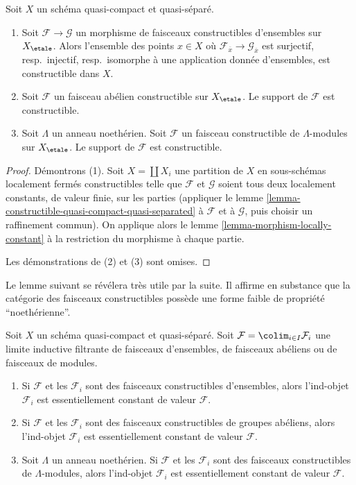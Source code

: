 \begin{lemma}
\label{lemma-support-constructible}
Soit $X$ un schéma quasi-compact et quasi-séparé.
\begin{enumerate}
\item Soit $\mathcal{F} \to \mathcal{G}$ un morphisme de faisceaux constructibles
d'ensembles sur $X_\etale$. Alors l'ensemble des points $x \in X$
où $\mathcal{F}_{\overline{x}} \to \mathcal{G}_{\overline{x}}$
est surjectif, resp.\ injectif, resp.\ isomorphe à une application donnée
d'ensembles, est constructible dans $X$.
\item Soit $\mathcal{F}$ un faisceau abélien constructible sur $X_\etale$.
Le support de $\mathcal{F}$ est constructible.
\item Soit $\Lambda$ un anneau noethérien.
Soit $\mathcal{F}$ un faisceau constructible de $\Lambda$-modules sur $X_\etale$.
Le support de $\mathcal{F}$ est constructible.
\end{enumerate}
\end{lemma}

\begin{proof}
Démontrons (1).
Soit $X = \coprod X_i$ une partition de $X$ en sous-schémas localement fermés
constructibles telle que $\mathcal{F}$ et $\mathcal{G}$ soient tous deux
localement constants, de valeur finie, sur les parties (appliquer le
lemme \ref{lemma-constructible-quasi-compact-quasi-separated}
à $\mathcal{F}$ et à $\mathcal{G}$, puis choisir un
raffinement commun). On applique alors le lemme \ref{lemma-morphism-locally-constant}
à la restriction du morphisme à chaque partie.

\medskip\noindent
Les démonstrations de (2) et (3) sont omises.
\end{proof}

\noindent
Le lemme suivant se révélera très utile par la suite.
Il affirme en substance que la catégorie des faisceaux constructibles
possède une forme faible de propriété ``noethérienne''.

\begin{lemma}
\label{lemma-colimit-constructible}
Soit $X$ un schéma quasi-compact et quasi-séparé. Soit
$\mathcal{F} = \colim_{i \in I} \mathcal{F}_i$ une limite inductive filtrante
de faisceaux d'ensembles, de faisceaux abéliens ou de faisceaux de modules.
\begin{enumerate}
\item Si $\mathcal{F}$ et les $\mathcal{F}_i$ sont des faisceaux constructibles
d'ensembles, alors l'ind-objet $\mathcal{F}_i$ est essentiellement constant de
valeur $\mathcal{F}$.
\item Si $\mathcal{F}$ et les $\mathcal{F}_i$ sont des faisceaux constructibles de
groupes abéliens, alors l'ind-objet $\mathcal{F}_i$ est essentiellement constant
de valeur $\mathcal{F}$.
\item Soit $\Lambda$ un anneau noethérien.
Si $\mathcal{F}$ et les $\mathcal{F}_i$ sont des faisceaux constructibles de
$\Lambda$-modules, alors l'ind-objet $\mathcal{F}_i$ est essentiellement constant
de valeur $\mathcal{F}$.
\end{enumerate}
\end{lemma}


